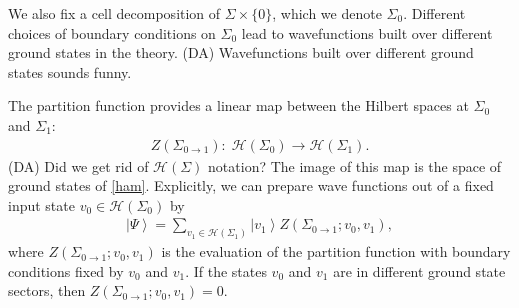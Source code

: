 \documentclass[12pt,a4paper]{article}
\newcounter{arrow}
\newcommand{\ra}{\rightarrow}
\newcommand{\mch}{\mathcal{H}}
\newcommand{\ket}[1]{\ensuremath{\left|#1\right\rangle}}
\newcommand{\dave}[1]{{\color{ao(english)}\footnotesize{(DA) #1}}}
\begin{document}
We also fix a cell decomposition of $\Sigma \times \{0\}$, which we denote $\Sigma_0$.
Different choices of boundary conditions on $\Sigma_0$ lead to wavefunctions built
over different ground states in the theory. 
\dave{Wavefunctions built over different ground states sounds funny. 
}

The partition function provides a linear map between the Hilbert spaces at $\Sigma_0$ and $\Sigma_1$:
\begin{align}
Z(\Sigma_{0\ra1} ): \; \mch(\Sigma_0) \ra \mch(\Sigma_1).
\end{align}
\dave{Did we get rid of $\mch(\Sigma)$ notation?}
The image of this map is the space of ground states of \eqref{ham}.
Explicitly, we can prepare wave functions out of a fixed input state $v_0\in \mch(\Sigma_0)$ by
%
\begin{align}\label{GroundState}
\ket{\Psi} = \sum_{v_1 \in \mch(\Sigma_1)} \ket{v_1} Z(\Sigma_{0\ra1}; v_0, v_1),
\end{align}
where $Z(\Sigma_{0\ra1}; v_0, v_1)$ is the evaluation of the partition function with 
boundary conditions fixed by $v_0$ and $v_1$. 
If the states $v_0$ and $v_1$ are in different ground state sectors, then $Z(\Sigma_{0\ra1};v_0,v_1)=0$. 
\end{document}

